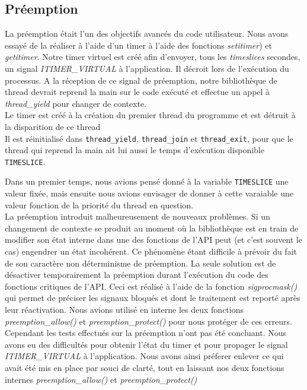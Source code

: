 \documentclass{article}
\begin{document}
    \subsection{Préemption}
    La préemption était l'un des objectifs avancés du code utilisateur.
Nous avons essayé de la réaliser à l'aide d'un timer à l'aide des fonctions \textit{setitimer}) et \textit{getitimer}. Notre timer virtuel est créé afin d'envoyer, tous les \textit{timeslices} secondes, un signal \textit{ITIMER\_VIRTUAL} à l'application. Il décroit lors de l'exécution du processus.
 A la réception de ce signal de préemption, notre bibliothèque de thread devrait reprend la main sur le code exécuté et effectue un appel à \textit{thread\_yield} pour changer de contexte.\\
Le timer est créé à la création du premier thread du programme et est détruit à la disparition de ce thread
\\
Il est réinitialisé dans \verb$thread_yield$, \verb$thread_join$ et
\verb$thread_exit$, pour que le thread qui reprend la main ait lui aussi le temps d'exécution disponible \verb$TIMESLICE$. 

Dans un premier temps, nous avions pensé donné à la variable \verb$TIMESLICE$ une valeur fixée, mais ensuite nous avions envisager de donner à cette varaiable une valeur fonction de la priorité du thread en question.
\\
La préemption introduit malheureusement de nouveaux problèmes. Si un changement de contexte se produit au moment où la bibliothèque est en train de modifier son état interne dans une des fonctions de l'API peut (et c'est souvent le cas) engendrer un état incohérent. Ce phénomène étant difficile à prévoir du fait de son caractère non déterminisme de préemption. La seule solution est de désactiver temporairement la préemption durant l'exécution du code des fonctions critiques de l'API. Ceci est réalisé à l'aide de la fonction \textit{sigprocmask()} qui permet de préciser les signaux bloqués et dont le traitement est reporté après leur réactivation. Nous avions utilisé en interne les deux fonctions \textit{preemption\_allow()} et \textit{preemption\_protect()} pour nous protéger de ces erreurs.\\

Cependant les tests effectués sur la préemption n'ont pas été concluant. Nous avons eu des difficultés pour obtenir l'état du timer et pour propager le signal \textit{ITIMER\_VIRTUAL} à l'application. Nous avons ainsi préferer enlever ce qui avait été mis en place par souci de clarté, tout en laissant nos deux fonctions internes \textit{preemption\_allow()} et \textit{preemption\_protect()}
\end{document}
